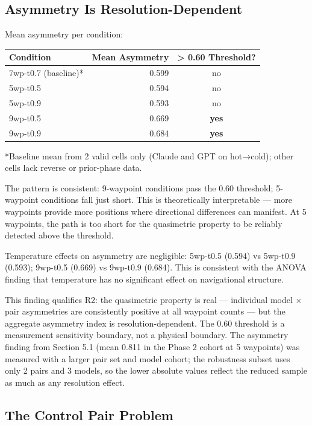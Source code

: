 \subsection{Asymmetry Is Resolution-Dependent}\label{asymmetry-is-resolution-dependent}

Mean asymmetry per condition:

\begin{longtable}[]{@{}lrc@{}}
\toprule\noalign{}
Condition & Mean Asymmetry & \textgreater{} 0.60 Threshold? \\
\midrule\noalign{}
\endhead
\bottomrule\noalign{}
\endlastfoot
7wp-t0.7 (baseline)* & 0.599 & no \\
5wp-t0.5 & 0.594 & no \\
5wp-t0.9 & 0.593 & no \\
9wp-t0.5 & 0.669 & \textbf{yes} \\
9wp-t0.9 & 0.684 & \textbf{yes} \\
\end{longtable}

*Baseline mean from 2 valid cells only (Claude and GPT on hot→cold); other cells lack reverse or prior-phase data.

The pattern is consistent: 9-waypoint conditions pass the 0.60 threshold; 5-waypoint conditions fall just short. This is theoretically interpretable --- more waypoints provide more positions where directional differences can manifest. At 5 waypoints, the path is too short for the quasimetric property to be reliably detected above the threshold.

Temperature effects on asymmetry are negligible: 5wp-t0.5 (0.594) vs 5wp-t0.9 (0.593); 9wp-t0.5 (0.669) vs 9wp-t0.9 (0.684). This is consistent with the ANOVA finding that temperature has no significant effect on navigational structure.

This finding qualifies R2: the quasimetric property is real --- individual model × pair asymmetries are consistently positive at all waypoint counts --- but the aggregate asymmetry index is resolution-dependent. The 0.60 threshold is a measurement sensitivity boundary, not a physical boundary. The asymmetry finding from Section 5.1 (mean 0.811 in the Phase 2 cohort at 5 waypoints) was measured with a larger pair set and model cohort; the robustness subset uses only 2 pairs and 3 models, so the lower absolute values reflect the reduced sample as much as any resolution effect.

\subsection{The Control Pair Problem}\label{the-control-pair-problem}

